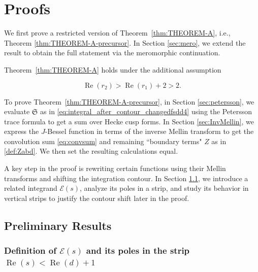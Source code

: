 \documentclass[]{article}
\renewcommand{\Re}{\operatorname{Re}}
\newcommand{\mathcalSsumdef}{\mathfrak{S}}
\begin{document}
\section{Proofs}\label{sec:proofs}

We first  prove a restricted version of Theorem~\ref{thm:THEOREM-A}, i.e., Theorem \ref{thm:THEOREM-A-precursor}. In Section \ref{sec:mero}, we extend the result to obtain the full statement via the meromorphic continuation.

{\thm \label{thm:THEOREM-A-precursor}
Theorem~\ref{thm:THEOREM-A} holds under the additional assumption 

\begin{equation}\label{cond_2a}
\operatorname{Re}(r_2) > \operatorname{Re}(r_1) + 2 > 2.
\end{equation}
}

 To prove Theorem~\ref{thm:THEOREM-A-precursor}, in Section \ref{sec:petersson}, we evaluate 
	$\mathcalSsumdef$ as in \eqref{eq:integral_after_contour_changedfsdd4} using the Petersson trace formula to get a sum over Hecke cusp forms.
 In Section \ref{sec:InvMellin}, we express the $J$-Bessel function in terms of the inverse Mellin transform to get the convolution sum \eqref{eq:convsum} and remaining ``boundary terms" $Z$ as in \eqref{def:Zabd}. We then set the resulting calculations equal.




  A key step in the proof is rewriting certain functions using their Mellin transforms and shifting the integration contour. In Section \ref{sec:preliminaryresults}, we introduce a related integrand $\mathcal{E}(s)$, analyze its poles in a strip, and study its behavior in vertical strips to justify the contour shift later in the proof.
\subsection{Preliminary Results}\label{sec:preliminaryresults}

\subsubsection{Definition of $\mathcal{E}(s)$ and its poles in the strip $\Re(s) < \Re (d)+1$}\label{sec:poles_of_E_sdklfjfjfskdkdkkk3}
\end{document}
